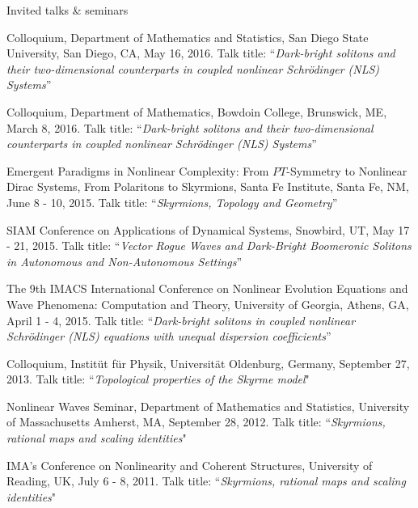 \documentclass[10pt]{article} %
\begin{document}
\begin{section}{Invited talks \& seminars}
\begin{etaremune}
\item   Colloquium, Department of Mathematics and Statistics, San Diego State University, San Diego, CA, May 16, 2016.
        Talk title: ``\textit{Dark-bright solitons and their two-dimensional counterparts in coupled nonlinear Schr\"odinger (NLS) Systems}''

\item   Colloquium, Department of Mathematics, Bowdoin College, Brunswick, ME, March 8, 2016.
        Talk title: ``\textit{Dark-bright solitons and their two-dimensional counterparts in coupled nonlinear Schr\"odinger (NLS) Systems}''
    
\item   Emergent Paradigms in Nonlinear Complexity: From $PT$-Symmetry to Nonlinear Dirac Systems, From Polaritons to Skyrmions, %
        Santa Fe Institute, Santa Fe, NM, June 8 - 10, 2015. Talk title: ``\textit{Skyrmions, Topology and Geometry}''

\item   SIAM Conference on Applications of Dynamical Systems, Snowbird, UT, May 17 - 21, 2015. Talk title: %
        ``\textit{Vector Rogue Waves and Dark-Bright Boomeronic Solitons in Autonomous and Non-Autonomous Settings}''

\item   The 9th IMACS International Conference on Nonlinear Evolution Equations and Wave Phenomena: Computation and Theory, %
        University of Georgia, Athens, GA, April 1 - 4, 2015. Talk title: %
        ``\textit{Dark-bright solitons in coupled nonlinear Schr\"odinger (NLS) equations with unequal dispersion coefficients}''      
   
\item   Colloquium, Instit\"ut f\"ur Physik, Universit\"at Oldenburg, Germany, September 27, 2013. Talk title: 
        ``\textit{Topological properties of the Skyrme model}"
  
\item   Nonlinear Waves Seminar, Department of Mathematics and Statistics, University of Massachusetts Amherst, MA, September 28, 2012.
        Talk title: ``\textit{Skyrmions, rational maps and scaling identities}"
   
\item   IMA's Conference on Nonlinearity and Coherent Structures, University of Reading, UK, July 6 - 8, 2011.
        Talk title: ``\textit{Skyrmions, rational maps and scaling identities}"

\end{etaremune}
\end{section}
\end{document}
